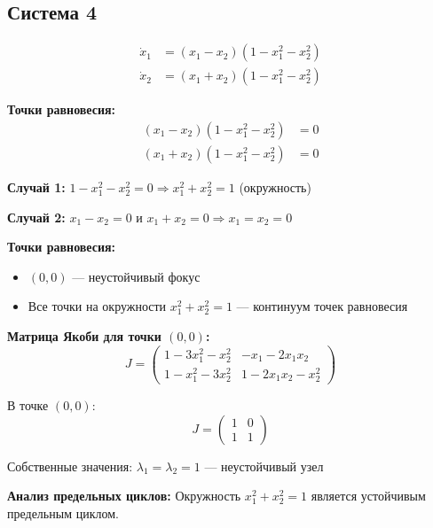 \subsection*{Система 4}

\begin{align}
\dot{x}_1 &= (x_1 - x_2)(1 - x_1^2 - x_2^2) \\
\dot{x}_2 &= (x_1 + x_2)(1 - x_1^2 - x_2^2)
\end{align}

\textbf{Точки равновесия:}
\begin{align}
(x_1 - x_2)(1 - x_1^2 - x_2^2) &= 0 \\
(x_1 + x_2)(1 - x_1^2 - x_2^2) &= 0
\end{align}

\textbf{Случай 1:} $1 - x_1^2 - x_2^2 = 0 \Rightarrow x_1^2 + x_2^2 = 1$ (окружность)

\textbf{Случай 2:} $x_1 - x_2 = 0$ и $x_1 + x_2 = 0 \Rightarrow x_1 = x_2 = 0$

\textbf{Точки равновесия:}
\begin{itemize}
\item $(0, 0)$ --- неустойчивый фокус
\item Все точки на окружности $x_1^2 + x_2^2 = 1$ --- континуум точек равновесия
\end{itemize}

\textbf{Матрица Якоби для точки $(0,0)$:}
$$J = \begin{pmatrix} 
1 - 3x_1^2 - x_2^2 & -x_1 - 2x_1x_2 \\
1 - x_1^2 - 3x_2^2 & 1 - 2x_1x_2 - x_2^2
\end{pmatrix}$$

В точке $(0, 0)$:
$$J = \begin{pmatrix} 
1 & 0 \\
1 & 1
\end{pmatrix}$$

Собственные значения: $\lambda_1 = \lambda_2 = 1$ --- неустойчивый узел

\textbf{Анализ предельных циклов:}
Окружность $x_1^2 + x_2^2 = 1$ является устойчивым предельным циклом.
